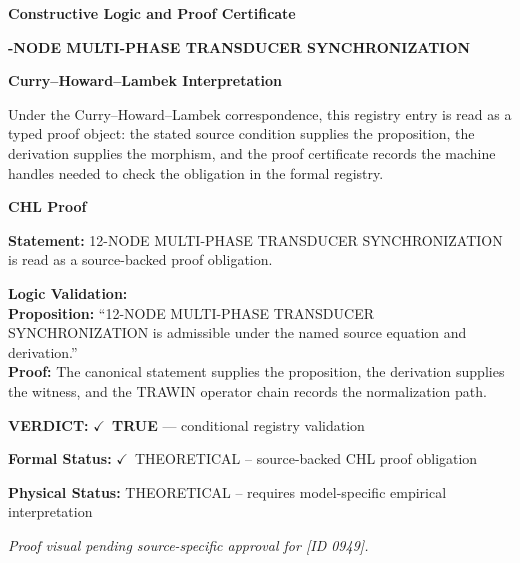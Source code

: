\clearpage
\begingroup\tzpsupportsetup
\noindent\textbf{\fontsize{10.8pt}{12.8pt}\selectfont [ID 0949] Constructive Logic and Proof Certificate}\par
\noindent\textbf{\fontsize{10pt}{12pt}-NODE MULTI-PHASE TRANSDUCER SYNCHRONIZATION}\par
\vspace{0.45em}
\begingroup
\footnotesize
\setlength{\parskip}{0.22em}
\setlength{\parindent}{0pt}
\noindent\textbf{Curry--Howard--Lambek Interpretation}\par
Under the Curry--Howard--Lambek correspondence, this registry entry is read as a typed proof
object: the stated source condition supplies the proposition, the derivation supplies the
morphism, and the proof certificate records the machine handles needed to check the obligation
in the formal registry.

\vspace{0.45em}
\noindent\textbf{CHL Proof}\par
\textbf{Statement:} 12-NODE MULTI-PHASE TRANSDUCER SYNCHRONIZATION is read as a source-backed proof obligation.

\textbf{Logic Validation:}\\
\textbf{Proposition:} ``12-NODE MULTI-PHASE TRANSDUCER SYNCHRONIZATION is admissible under the named source equation and derivation.''\\
\textbf{Proof:} The canonical statement supplies the proposition, the derivation supplies the witness, and the TRAWIN operator chain records the normalization path.

\textbf{VERDICT:} \ensuremath{\checkmark}\ \textbf{TRUE} --- conditional registry validation

\textbf{Formal Status:} \ensuremath{\checkmark}\ THEORETICAL -- source-backed CHL proof obligation

\textbf{Physical Status:} THEORETICAL -- requires model-specific empirical interpretation
\par\vspace{0.45em}
\par
\vfill
\begingroup\footnotesize\itshape
Proof visual pending source-specific approval for [ID 0949].
\par\endgroup
\vfill
\endgroup
\endgroup
